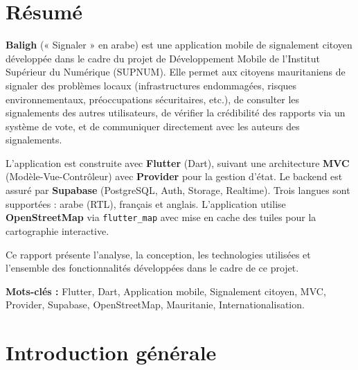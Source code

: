 \documentclass[12pt,a4paper]{report}
\begin{document}
\chapter*{Résumé}
\thispagestyle{plain}

\textbf{Baligh} (« Signaler » en arabe) est une application mobile de signalement citoyen développée dans le cadre du projet de Développement Mobile de l'Institut Supérieur du Numérique (SUPNUM). Elle permet aux citoyens mauritaniens de signaler des problèmes locaux (infrastructures endommagées, risques environnementaux, préoccupations sécuritaires, etc.), de consulter les signalements des autres utilisateurs, de vérifier la crédibilité des rapports via un système de vote, et de communiquer directement avec les auteurs des signalements.

L'application est construite avec \textbf{Flutter} (Dart), suivant une architecture \textbf{MVC} (Modèle-Vue-Contrôleur) avec \textbf{Provider} pour la gestion d'état. Le backend est assuré par \textbf{Supabase} (PostgreSQL, Auth, Storage, Realtime). Trois langues sont supportées : arabe (RTL), français et anglais. L'application utilise \textbf{OpenStreetMap} via \texttt{flutter\_map} avec mise en cache des tuiles pour la cartographie interactive.

Ce rapport présente l'analyse, la conception, les technologies utilisées et l'ensemble des fonctionnalités développées dans le cadre de ce projet.

\vspace{0.5cm}
\textbf{Mots-clés :} Flutter, Dart, Application mobile, Signalement citoyen, MVC, Provider, Supabase, OpenStreetMap, Mauritanie, Internationalisation.

\tableofcontents
\newpage

\listoffigures
\newpage

\chapter*{Introduction générale}
\thispagestyle{plain}
\end{document}
